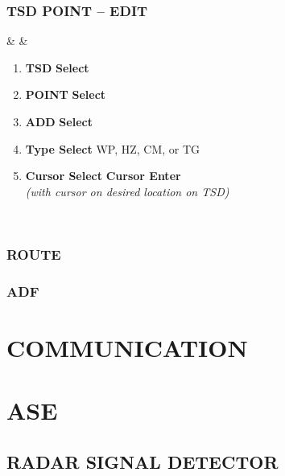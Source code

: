 \documentclass[fontInter]{TechCheck}
\begin{document}
	\subsection{TSD POINT -- EDIT}
	\begin{listlongtable}
			\textbf{\textbullet} &  &
			\begin{minipage}[t]{\linewidth}
				\vspace{-7pt}
				\begin{enumerate}
					\item \textbf{TSD} \dotfill \textbf{Select}
					\item \textbf{POINT} \dotfill \textbf{Select}
					\item \textbf{ADD} \dotfill \textbf{Select}
					\item \textbf{Type Select} \dotfill WP, HZ, CM, or TG 
					\item \textbf{Cursor Select} \dotfill \textbf{Cursor Enter} \\
					\hfill \emph{(with cursor on desired location on TSD)}
				\end{enumerate}
			\end{minipage} \\
			\end{listlongtable}

	
	
	\subsection{ROUTE}

	\subsection{ADF}

	\cleardoublepage

	\chapter{COMMUNICATION}
	\minitoc
	\cleardoublepage

	\chapter{ASE}
	\minitoc
	\cleardoublepage

	
	\section{RADAR SIGNAL DETECTOR}
\end{document}
